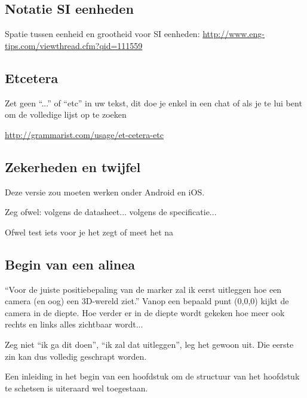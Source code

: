 
\subsection{Notatie SI eenheden}

Spatie tussen eenheid en grootheid voor SI eenheden: \url{http://www.eng-tips.com/viewthread.cfm?qid=111559}


\subsection{Etcetera}
Zet geen ``...'' of ``etc'' in uw tekst, dit doe je enkel in een chat of als je te lui bent om de volledige lijst op te zoeken

\url{http://grammarist.com/usage/et-cetera-etc}


\subsection{Zekerheden en twijfel}

Deze versie zou moeten werken onder Android en iOS.

Zeg ofwel: volgens de datasheet... volgens de specificatie...

Ofwel test iets voor je het zegt of meet het na


\subsection{Begin van een alinea}
``Voor de juiste positiebepaling van de marker zal ik eerst uitleggen hoe een camera (en oog) een 3D-wereld ziet.''
Vanop een bepaald punt (0,0,0) kijkt de camera in de diepte. Hoe verder er in de diepte wordt
gekeken hoe meer ook rechts en links alles zichtbaar wordt...

Zeg niet ``ik ga dit doen'', ``ik zal dat uitleggen'', leg het gewoon uit. Die eerste zin kan dus volledig geschrapt worden.

Een inleiding in het begin van een hoofdstuk om de structuur van het hoofdstuk te schetsen is uiteraard wel toegestaan.


